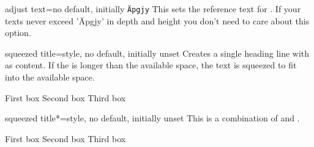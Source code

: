 \begin{docTcbKey}{adjust text}{=}{no default, initially \texttt{\"Apgjy}}
  This sets the reference text for . If your texts
  never exceed '\"Apgjy' in depth and height you don't need to care about this option.
\end{docTcbKey}

\clearpage

\begin{docTcbKey}[][doc new=2014-11-24]{squeezed title}{=}{style, no default, initially unset}
  Creates a single heading line with  as content.
  If the  is longer than the available space, the text is
  squeezed to fit into the available space.
\begin{dispExample}
\begin{tcbitemize}[raster columns=3,raster equal height,
  colframe=red!75!black,colback=red!5!white,fonttitle=\bfseries]
\tcbitem[squeezed title={Short title}]
  First box
\tcbitem[squeezed title={This is a very very long title}]
  Second box
\tcbitem[squeezed title={This title is clearly to long for this application}]
  Third box
\end{tcbitemize}
\end{dispExample}
\end{docTcbKey}

\begin{docTcbKey}[][doc new=2014-11-24]{squeezed title*}{=}{style, no default, initially unset}
  This is a combination of  and  .
\begin{dispExample}
\begin{tcbitemize}[raster columns=3,raster equal height,
  colframe=red!75!black,colback=red!5!white,fonttitle=\bfseries]
\tcbitem[squeezed title*={Short title}]
  First box
\tcbitem[squeezed title*={This is a very very long title}]
  Second box
\tcbitem[squeezed title*={This title is clearly to long for this application}]
  Third box
\end{tcbitemize}
\end{dispExample}
\end{docTcbKey}

